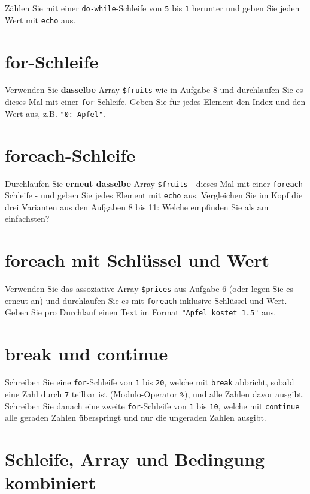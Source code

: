 \documentclass[a4paper,12pt]{article}
\begin{document}
Zählen Sie mit einer \texttt{do-while}-Schleife von \texttt{5} bis \texttt{1} herunter und geben Sie jeden Wert mit \texttt{echo} aus.

\section{for-Schleife}

Verwenden Sie \textbf{dasselbe} Array \texttt{\$fruits} wie in Aufgabe 8 und durchlaufen Sie es dieses Mal mit einer \texttt{for}-Schleife. Geben Sie für jedes Element den Index und den Wert aus, z.B. \texttt{"0: Apfel"}.

\section{foreach-Schleife}

Durchlaufen Sie \textbf{erneut dasselbe} Array \texttt{\$fruits} - dieses Mal mit einer \texttt{foreach}-Schleife - und geben Sie jedes Element mit \texttt{echo} aus. Vergleichen Sie im Kopf die drei Varianten aus den Aufgaben 8 bis 11: Welche empfinden Sie als am einfachsten?

\section{foreach mit Schlüssel und Wert}

Verwenden Sie das assoziative Array \texttt{\$prices} aus Aufgabe 6 (oder legen Sie es erneut an) und durchlaufen Sie es mit \texttt{foreach} inklusive Schlüssel und Wert. Geben Sie pro Durchlauf einen Text im Format \texttt{"Apfel kostet 1.5"} aus.

\section{break und continue}

Schreiben Sie eine \texttt{for}-Schleife von \texttt{1} bis \texttt{20}, welche mit \texttt{break} abbricht, sobald eine Zahl durch \texttt{7} teilbar ist (Modulo-Operator \texttt{\%}), und alle Zahlen davor ausgibt. Schreiben Sie danach eine zweite \texttt{for}-Schleife von \texttt{1} bis \texttt{10}, welche mit \texttt{continue} alle geraden Zahlen überspringt und nur die ungeraden Zahlen ausgibt.

\section{Schleife, Array und Bedingung kombiniert}
\end{document}
